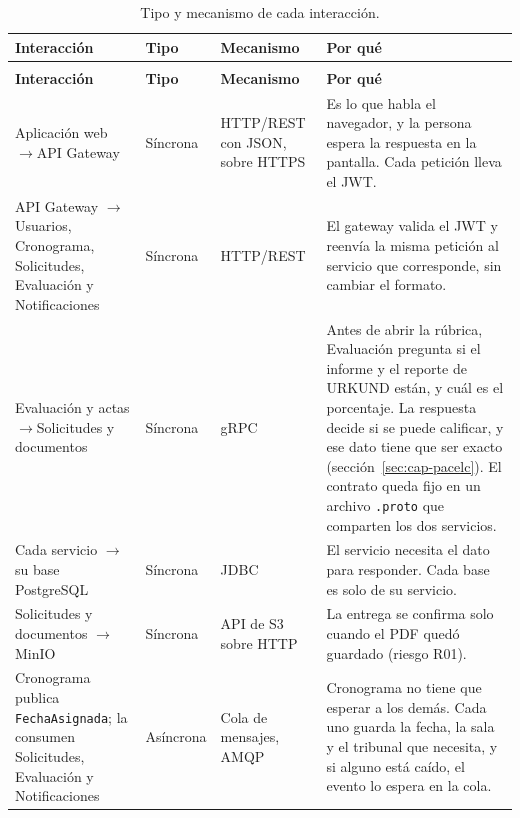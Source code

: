 \begingroup
\footnotesize
\begin{xltabular}{\textwidth}{@{}>{\raggedright\arraybackslash}p{3.4cm} >{\raggedright\arraybackslash}p{1.5cm} >{\raggedright\arraybackslash}p{2.2cm} >{\raggedright\arraybackslash}X@{}}
    \caption{Tipo y mecanismo de cada interacción.}
    \label{tab:comunicacion} \\
    \toprule
    \textbf{Interacción} & \textbf{Tipo} & \textbf{Mecanismo} & \textbf{Por qué} \\
    \midrule
    \endfirsthead
     \\
    \toprule
    \textbf{Interacción} & \textbf{Tipo} & \textbf{Mecanismo} & \textbf{Por qué} \\
    \midrule
    \endhead
    \bottomrule
    \endlastfoot
    Aplicación web $\rightarrow$API Gateway & Síncrona & HTTP/REST con JSON, sobre HTTPS & Es lo que habla el navegador, y la persona espera la respuesta en la pantalla. Cada petición lleva el JWT. \\
    \addlinespace
    API Gateway $\rightarrow$Usuarios, Cronograma, Solicitudes, Evaluación y Notificaciones & Síncrona & HTTP/REST & El gateway valida el JWT y reenvía la misma petición al servicio que corresponde, sin cambiar el formato. \\
    \addlinespace
    Evaluación y actas $\rightarrow$Solicitudes y documentos & Síncrona & gRPC & Antes de abrir la rúbrica, Evaluación pregunta si el informe y el reporte de URKUND están, y cuál es el porcentaje. La respuesta decide si se puede calificar, y ese dato tiene que ser exacto (sección~\ref{sec:cap-pacelc}). El contrato queda fijo en un archivo \texttt{.proto} que comparten los dos servicios. \\
    \addlinespace
    Cada servicio $\rightarrow$su base PostgreSQL & Síncrona & JDBC & El servicio necesita el dato para responder. Cada base es solo de su servicio. \\
    \addlinespace
    Solicitudes y documentos $\rightarrow$MinIO & Síncrona & API de S3 sobre HTTP & La entrega se confirma solo cuando el PDF quedó guardado (riesgo R01). \\
    \addlinespace
    Cronograma publica \texttt{FechaAsignada}; la consumen Solicitudes, Evaluación y Notificaciones & Asíncrona & Cola de mensajes, AMQP & Cronograma no tiene que esperar a los demás. Cada uno guarda la fecha, la sala y el tribunal que necesita, y si alguno está caído, el evento lo espera en la cola. \\

\end{xltabular}
